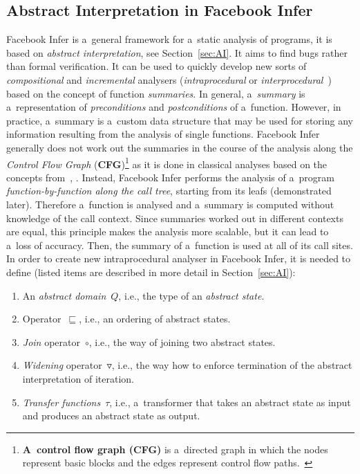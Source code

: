 \subsection{Abstract Interpretation in Facebook Infer}

Facebook Infer is a~general framework for a~static analysis of programs, it is
based on \emph{abstract interpretation}, see Section~\ref{sec:AI}. It aims
to find bugs rather than formal verification. It can be used to quickly develop
new sorts of \emph{compositional} and \emph{incremental} analysers
(\emph{intraprocedural} or
\emph{interprocedural}~\cite{programAnalysisNielson}) based
on the concept of function \emph{summaries}. In general, a~\emph{summary}
is a~representation of \emph{preconditions} and \emph{postconditions} of
a~function. However, in practice, a~summary is a~custom data structure that
may be used for storing any information resulting from the analysis of
single functions. Facebook Infer generally does not work out the summaries
in the course of the analysis along the \emph{Control Flow Graph}
(\textbf{CFG})\footnote{\textbf{A~control flow graph (CFG)} is a~directed
graph in which the nodes represent basic blocks and the edges represent control
flow paths.~\cite{controlFlowAnalysisAllen}} as it is done in classical
analyses based on the concepts from~\cite{dataflowAnalysisGraphReachability},
\cite{dataflowAnalysisApproaches}. Instead, Facebook Infer performs the
analysis of a~program \emph{function-by-function along the call tree},
starting from its leafs (demonstrated later). Therefore a~function
is analysed and a~summary is computed without knowledge of the
call context. Since summaries worked out in different contexts are equal,
this principle makes the analysis more scalable, but it can lead to
a~loss of accuracy. Then, the summary of a~function is used at all of its
call sites. In order to create new intraprocedural analyser in Facebook
Infer, it is needed to define (listed items are described in more detail
in Section~\ref{sec:AI}):
\begin{enumerate}
    \item
        An \emph{abstract domain}~$ Q $, i.e., the type of an
        \emph{abstract state}.

    \item
        Operator~$ \sqsubseteq $, i.e., an ordering of abstract states.

    \item
        \emph{Join} operator~$ \circ $, i.e., the way of joining two abstract
        states.

    \item
        \emph{Widening} operator~$ \triangledown $, i.e., the way how to
        enforce termination of the abstract interpretation of iteration.

    \item
        \emph{Transfer functions}~$ \tau $, i.e., a~transformer that
        takes an abstract state as input and produces an abstract state
        as output.
\end{enumerate}
